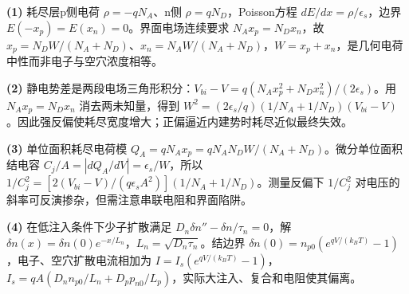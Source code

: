 \par\noindent\textbf{(1)} 耗尽层p侧电荷 \(\rho=-qN_A\)、n侧 \(\rho=qN_D\)，Poisson方程 \(dE/dx=\rho/\epsilon_s\)，边界 \(E(-x_p)=E(x_n)=0\)。界面电场连续要求 \(N_Ax_p=N_Dx_n\)，故 \(x_p=N_DW/(N_A+N_D)\)、\(x_n=N_AW/(N_A+N_D)\)，\(W=x_p+x_n\)，是几何电荷中性而非电子与空穴浓度相等。
\par\noindent\textbf{(2)} 静电势差是两段电场三角形积分：\(V_{bi}-V=q(N_Ax_p^2+N_Dx_n^2)/(2\epsilon_s)\)。用 \(N_Ax_p=N_Dx_n\) 消去两未知量，得到 \(W^2=(2\epsilon_s/q)(1/N_A+1/N_D)(V_{bi}-V)\)。因此强反偏使耗尽宽度增大；正偏逼近内建势时耗尽近似最终失效。
\par\noindent\textbf{(3)} 单位面积耗尽电荷模 \(Q_A=qN_Ax_p=qN_AN_DW/(N_A+N_D)\)。微分单位面积结电容 \(C_j/A=|dQ_A/dV|=\epsilon_s/W\)，所以 \(1/C_j^2=[2(V_{bi}-V)/(q\epsilon_sA^2)](1/N_A+1/N_D)\)。测量反偏下 \(1/C_j^2\) 对电压的斜率可反演掺杂，但需注意串联电阻和界面陷阱。
\par\noindent\textbf{(4)} 在低注入条件下少子扩散满足 \(D_n\delta n''-\delta n/\tau_n=0\)，解 \(\delta n(x)=\delta n(0)e^{-x/L_n}\)，\(L_n=\sqrt{D_n\tau_n}\)。结边界 \(\delta n(0)=n_{p0}(e^{qV/(k_BT)}-1)\)，电子、空穴扩散电流相加为 \(I=I_s(e^{qV/(k_BT)}-1)\)，\(I_s=qA(D_nn_{p0}/L_n+D_pp_{n0}/L_p)\)，实际大注入、复合和电阻使其偏离。
